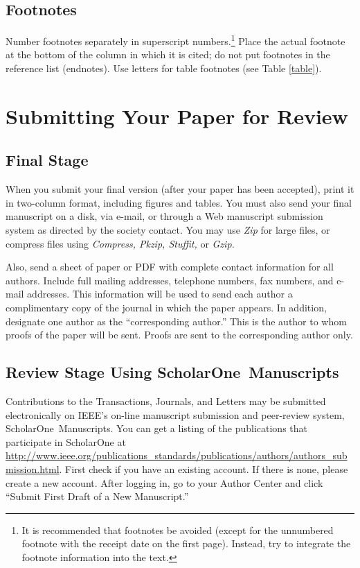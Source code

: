 \documentclass[twoside,web]{ieeecolor}
\begin{document}
\subsection{Footnotes}
Number footnotes separately in superscript numbers.\footnote{It is recommended that footnotes be avoided (except for 
the unnumbered footnote with the receipt date on the first page). Instead, 
try to integrate the footnote information into the text.} Place the actual 
footnote at the bottom of the column in which it is cited; do not put 
footnotes in the reference list (endnotes). Use letters for table footnotes 
(see Table \ref{table}).

\section{Submitting Your Paper for Review}

\subsection{Final Stage}
When you submit your final version (after your paper has been accepted), 
print it in two-column format, including figures and tables. You must also 
send your final manuscript on a disk, via e-mail, or through a Web 
manuscript submission system as directed by the society contact. You may use 
\emph{Zip} for large files, or compress files using \emph{Compress, Pkzip, Stuffit,} or \emph{Gzip.} 

Also, send a sheet of paper or PDF with complete contact information for all 
authors. Include full mailing addresses, telephone numbers, fax numbers, and 
e-mail addresses. This information will be used to send each author a 
complimentary copy of the journal in which the paper appears. In addition, 
designate one author as the ``corresponding author.'' This is the author to 
whom proofs of the paper will be sent. Proofs are sent to the corresponding 
author only.

\subsection{Review Stage Using ScholarOne\textregistered\ Manuscripts}
Contributions to the Transactions, Journals, and Letters may be submitted 
electronically on IEEE's on-line manuscript submission and peer-review 
system, ScholarOne\textregistered\ Manuscripts. You can get a listing of the 
publications that participate in ScholarOne at 
\underline{http://www.ieee.org/publications\_standards/publications/}\discretionary{}{}{}\underline{authors/authors\_submission.html}.
First check if you have an existing account. If there is none, please create 
a new account. After logging in, go to your Author Center and click ``Submit 
First Draft of a New Manuscript.'' 
\end{document}
